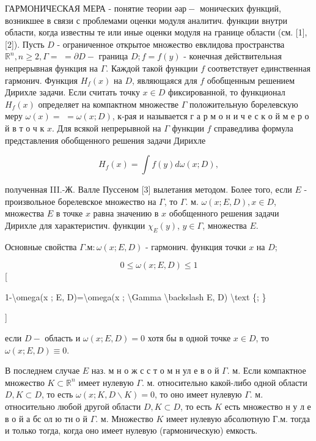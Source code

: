 \documentclass[10pt]{article}
\begin{document}
ГАРМОНИЧЕСКАЯ МЕРА - понятие теории $ә а р-$ монических функций, возникшее в связи с проблемами оценки модуля аналитич. функции внутри области, когда известны те или иные оценки модуля на границе области (см. [1], [2]). Пусть $D$ - ограниченное открытое множество евклидова пространства $\mathbb{R}^{n}, n \geqslant 2, \Gamma=$ $=\partial D-$ граница $D ; f=f(y)$ - конечная действительная непрерывная функция на $\Gamma$. Каждой такой функции $f$ соответствует единственная гармонич. Функция $H_{f}(x)$ на $D$, являющаяся для $f$ обобщенным решением Дирихле задачи. Если считать точку $x \in D$ фиксированной, то функционал $H_{f}(x)$ определяет на компактном множестве $\Gamma$ положительную борелевскую меру $\omega(x)=$ $=\omega(x ; D)$, к-рая и называется г а р м о н и ч е с к о й м е р о й в т о ч к $x$. Для всякой непрерывной на $\Gamma$ функции $f$ справедлива формула представления обобщенного решения задачи Дирихле



\[

H_{f}(x)=\int f(y) d \omega(x ; D),

\]



полученная III.-Ж. Валле Пуссеном [3] вылетания методом. Более того, если $E$ - произвольное борелевское множество на $\Gamma$, то $\Gamma$. м. $\omega(x ; E, D), x \in D$, множества $E$ в точке $x$ равна значению в $x$ обобщенного решения задачи Дирихле для характеристич. функции $\chi_{E}(y)$, $y \in \Gamma$, множества $E$.



Основные свойства $\Gamma . м: \omega(x ; E, D)$ - гармонич. функция точки $x$ на $D$;



\[

0 \leqslant \omega(x ; E, D) \leqslant 1

\][



1-\textbackslash omega(x ; E, D)=\textbackslash omega(x ; \textbackslash Gamma \textbackslash backslash E, D) \textbackslash text \{; \}

]



если $D-$ область и $\omega(x ; E, D)=0$ хотя бы в одной точке $x \in D$, то $\omega(x ; E, D) \equiv 0$.



В последнем случае $E$ наз. м н о ж с с т о м н ул е в о й $\Gamma$. м. Если компактное множество $K \subset \mathbb{R}^{n}$ имеет нулевую $\Gamma$. м. относительно какой-либо одной области $D, K \subset D$, то есть $\omega(x ; K, D \backslash K)=0$, то оно имеет нулевую $\Gamma$. м. относительно любой другой области $D, K \subset D$, то есть $K$ есть множество н у л е в о й а бс ол ю тн о й $\Gamma$. м. Множество $K$ имеет нулевую абсолютную Г.м. тогда и только тогда, когда оно имеет нулевую (гармоническую) емкость.
\end{document}
